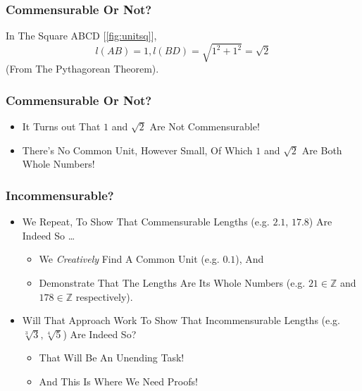 \documentclass{beamer}
\begin{document}
\begin{frame}
\frametitle{Commensurable Or Not?}

In The Square ABCD [\ref{fig:unitsq}], 
\pause
\[
l(AB)=1, l(BD)=\sqrt{1^2+1^2}=\sqrt{2}
\]
\pause
(From The Pythagorean Theorem).

\end{frame}


\begin{frame}
\frametitle{Commensurable Or Not?}

\begin{itemize}
\item It Turns out That \alert{$1$ and $\sqrt{2}$ Are Not Commensurable}!
\pause
\item There's \alert{No Common Unit}, However Small, Of Which $1$ and $\sqrt{2}$ Are Both Whole Numbers!
\end{itemize}
\end{frame}


\begin{frame}
\frametitle{Incommensurable?}

\begin{itemize}
\item We Repeat, \alert{To Show That Commensurable Lengths \pause(e.g. $2.1$, $17.8$) \pause Are Indeed So \dots}
\pause
\begin{itemize}
\item We \textit{Creatively} Find A Common Unit \pause(e.g. $0.1$), And
\pause
\item Demonstrate That The Lengths Are Its Whole Numbers \pause(e.g. $21\in\mathbb{Z}$ and $178\in\mathbb{Z}$ respectively).
\end{itemize}
\pause
\item Will That Approach Work \alert{To Show That Incommensurable Lengths \pause(e.g. $\sqrt[3]{3},\sqrt[4]{5}$) Are Indeed So}? 
\begin{itemize}
\pause
\item That Will Be An Unending Task! 
\pause 
\item And This Is Where We Need \alert{Proofs!}
\end{itemize}
\end{itemize}
\end{frame}
\end{document}
